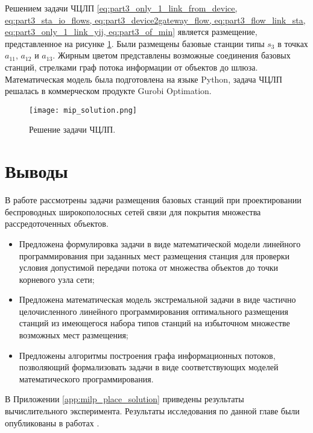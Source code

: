 Решением задачи ЧЦЛП \cref{eq:part3_only_1_link_from_device, eq:part3_sta_io_flows, eq:part3_device2gateway_flow, eq:part3_flow_link_sta, eq:part3_only_1_link_yij, eq:part3_of_min} является размещение, представленное на рисунке \cref{fig:part3_mip_solution}. Были размещены базовые станции типы $s_3$ в точках $a_11$, $a_12$ и $a_13$. Жирным цветом представлены возможные соединения базовых станций, стрелками граф потока информации от объектов до шлюза. Математическая модель была подготовлена на языке Python, задача ЧЦЛП решалась в коммерческом продукте Gurobi Optimation. 

\begin{figure}[hbt!]
    \centering
     \texttt{[image: mip\_solution.png]}
  \caption{Решение задачи ЧЦЛП.}
  \label{fig:part3_mip_solution}
\end{figure}

\FloatBarrier
\section{Выводы}

В работе рассмотрены задачи размещения базовых станций при проектировании беспроводных широкополосных сетей связи для покрытия множества рассредоточенных объектов. 
\begin{itemize}
    \item Предложена формулировка задачи в виде математической модели линейного программирования при заданных мест размещения станция для проверки условия допустимой передачи потока от множества объектов до точки корневого узла сети;
    \item Предложена математическая модель экстремальной задачи в виде частично целочисленного линейного программирования оптимального размещения станций из имеющегося набора типов станций на избыточном множестве возможных мест размещения;
    \item Предложены алгоритмы построения графа информационных потоков, позволяющий формализовать задачи в виде соответствующих моделей математического программирования. 
\end{itemize}


В Приложении \cref{app:milp_place_solution} приведены результаты вычислительного эксперимента. Результаты исследования по данной главе были опубликованы в работах \cite{MukhtarovPershinGUBKIN2018_RSCI, MukhtarovPershinVSPU2019_RSCI, MukhtarovPershinMLSD2019works_RSCI, MukhtarovPershinMLSD2019materials_RSCI,MukhtarovPershinGUBKIN2019_RSCI}. 

\FloatBarrier
